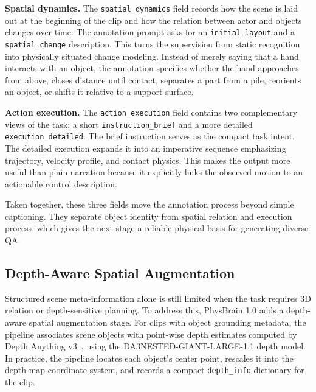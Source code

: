 \documentclass{llmxive}
\providecommand{\paragraph}[1]{\noindent\textbf{#1.}\hspace*{1em}}
\begin{document}
\paragraph{Spatial dynamics}
The \texttt{spatial\_dynamics} field records how the scene is laid out at the beginning of the clip and how the relation between actor and objects changes over time. The annotation prompt asks for an \texttt{initial\_layout} and a \texttt{spatial\_change} description. This turns the supervision from static recognition into physically situated change modeling. Instead of merely saying that a hand interacts with an object, the annotation specifies whether the hand approaches from above, closes distance until contact, separates a part from a pile, reorients an object, or shifts it relative to a support surface.

\paragraph{Action execution}
The \texttt{action\_execution} field contains two complementary views of the task: a short \texttt{instruction\_brief} and a more detailed \texttt{execution\_detailed}. The brief instruction serves as the compact task intent. The detailed execution expands it into an imperative sequence emphasizing trajectory, velocity profile, and contact physics. This makes the output more useful than plain narration because it explicitly links the observed motion to an actionable control description.

Taken together, these three fields move the annotation process beyond simple captioning. They separate object identity from spatial relation and execution process, which gives the next stage a reliable physical basis for generating diverse QA. 

\subsection{Depth-Aware Spatial Augmentation}

Structured scene meta-information alone is still limited when the task requires 3D relation or depth-sensitive planning. To address this, PhysBrain 1.0 adds a depth-aware spatial augmentation stage. For clips with object grounding metadata, the pipeline associates scene objects with point-wise depth estimates computed by Depth Anything v3~\cite{lin2025depth}, using the DA3NESTED-GIANT-LARGE-1.1 depth model. In practice, the pipeline locates each object's center point, rescales it into the depth-map coordinate system, and records a compact \texttt{depth\_info} dictionary for the clip.
\end{document}
